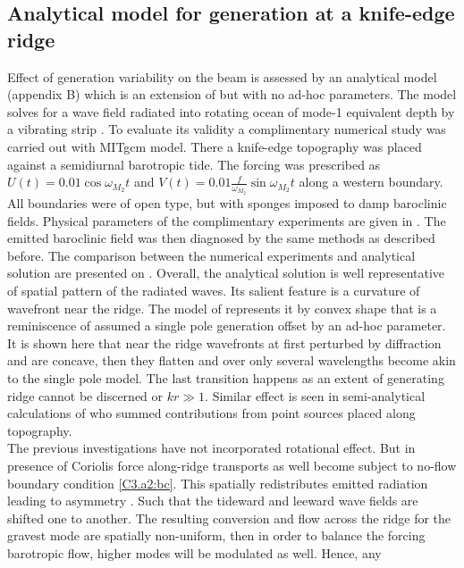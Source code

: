 \documentclass[12pt]{article}
\begin{document}
\subsection{Analytical model for generation at a knife-edge ridge}
Effect of generation variability on the beam is assessed by an analytical model (appendix B) 
which is an extension of \citep{rainville2010interference} but with no ad-hoc parameters. 
The model solves for a wave field radiated into rotating ocean of mode-1 equivalent depth by a 
vibrating strip \citep{morse1946methods}. To evaluate its validity a complimentary numerical 
study was carried out with MITgcm model. There a knife-edge topography was placed against a 
semidiurnal barotropic tide. The forcing was prescribed as $U(t) = 0.01 \cos 
\omega_{M_2} t$ and $V(t) = 0.01 \frac{f}{\omega_{M_2}} \sin \omega_{M_2} t$ along a western  
boundary. All boundaries were of open type, but with sponges imposed to damp baroclinic fields. 
Physical parameters of the complimentary experiments are given in . The 
emitted baroclinic field was then diagnosed by the same methods as described before. The comparison 
between 
the numerical experiments and analytical solution are presented on . 
Overall, the analytical solution is well representative of spatial pattern of the radiated waves. 
Its 
salient feature is a curvature of wavefront near the ridge. The model of 
\citep{rainville2010interference} represents it by convex shape that is a reminiscence of 
assumed a single pole generation offset by an ad-hoc parameter. It is shown here that near the 
ridge wavefronts at first perturbed by diffraction and are concave, then they flatten and 
over only 
several wavelengths become akin to the single pole model. The last transition happens as an extent 
of generating ridge cannot be discerned or $kr \gg 1$. Similar effect is seen in semi-analytical 
calculations of \citep{zhang2014modeling} who summed contributions from point sources placed along 
topography.\\
The previous investigations have not incorporated rotational effect. But in presence of Coriolis 
force along-ridge transports as well become subject to no-flow boundary condition \eqref{C3.a2:bc}. 
This spatially redistributes emitted radiation leading to asymmetry . Such that the tideward and leeward wave fields are shifted one to another. The resulting 
conversion and flow across the ridge for the gravest mode are spatially non-uniform, then in order 
to balance the forcing barotropic flow, higher modes will be modulated as well. Hence, any 
\end{document}
